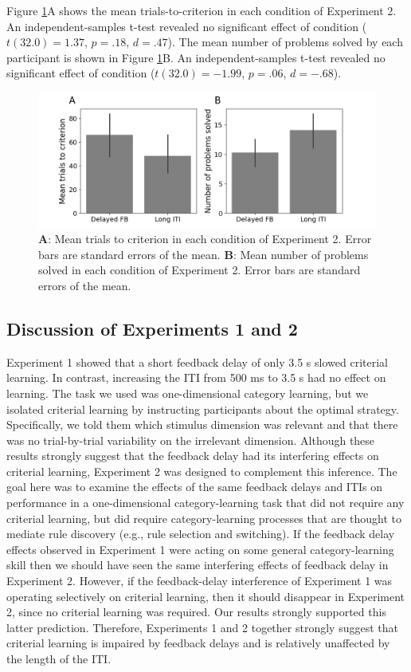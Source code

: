 \documentclass[doc, floatsintext]{apa7}
\begin{document}
Figure \ref{fig_exp_2_t2c}A shows the mean
trials-to-criterion in each condition of Experiment 2. An
independent-samples t-test revealed no significant effect of
condition ($t(32.0)=1.37$, $p = .18$, $d = .47$).  The mean
number of problems solved by each participant is shown in
Figure \ref{fig_exp_2_t2c}B. An independent-samples t-test
revealed no significant effect of condition ($t(32.0) =
-1.99$, $p = .06$, $d = -.68$).

\begin{figure}
  \centering
  \includegraphics[width=.8\textwidth]{../figures/fig_exp_2_t2c.png}
    \caption{
        \textbf{A}: Mean trials to criterion in each
        condition of Experiment 2. Error bars are standard
        errors of the mean.
        \textbf{B}: Mean number of problems solved in each
        condition of Experiment 2. Error bars are standard
        errors of the mean.
}
  \label{fig_exp_2_t2c}
\end{figure}

\subsection{Discussion of Experiments 1 and 2}
Experiment 1 showed that a short feedback delay of only 3.5
s slowed criterial learning. In contrast, increasing the ITI
from 500 ms to 3.5 s had no effect on learning. The task we
used was one-dimensional category learning, but we isolated
criterial learning by instructing participants about the
optimal strategy. Specifically, we told them which stimulus
dimension was relevant and that there was no trial-by-trial
variability on the irrelevant dimension. Although these
results strongly suggest that the feedback delay had its
interfering effects on criterial learning, Experiment 2 was
designed to complement this inference. The goal here was to
examine the effects of the same feedback delays and ITIs on
performance in a one-dimensional category-learning task that
did not require any criterial learning, but did require
category-learning processes that are thought to mediate rule
discovery (e.g., rule selection and switching). If the
feedback delay effects observed in Experiment 1 were acting
on some general category-learning skill then we should have
seen the same interfering effects of feedback delay in
Experiment 2. However, if the feedback-delay interference of
Experiment 1 was operating selectively on criterial
learning, then it should disappear in Experiment 2, since no
criterial learning was required.  Our results strongly
supported this latter prediction.  Therefore, Experiments 1
and 2 together strongly suggest that criterial learning is
impaired by feedback delays and is relatively unaffected by
the length of the ITI.
\end{document}
